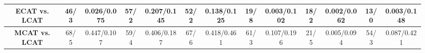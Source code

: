 \documentclass[sigconf,review,anonymous]{acmart}
\begin{document}
\begin{table}[t]
{\begin{tabular}{|c|cc|cc|cc|cc|cc|cc|}
\textbf{ECAT vs. LCAT}
& \multicolumn{1}{c|}{46/3}   & 0.026/0.075
& \multicolumn{1}{c|}{57/2}   & 0.207/0.145
& \multicolumn{1}{c|}{52/2}   & 0.138/0.125
& \multicolumn{1}{c|}{19/8}   & 0.003/0.102
& \multicolumn{1}{c|}{18/2}   & 0.002/0.062
& \multicolumn{1}{c|}{13/0}   & 0.003/0.148
\\ \hline

\textbf{MCAT vs. LCAT}
& \multicolumn{1}{c|}{68/5}   & 0.447/0.107
& \multicolumn{1}{c|}{59/4}   & 0.406/0.187
& \multicolumn{1}{c|}{67/6}   & 0.418/0.461
& \multicolumn{1}{c|}{61/3}   & 0.107/0.196
& \multicolumn{1}{c|}{21/5}   & 0.005/0.094
& \multicolumn{1}{c|}{54/3}   & 0.087/0.421
\\ \hline

\end{tabular}%
}
\end{table}
\end{document}
